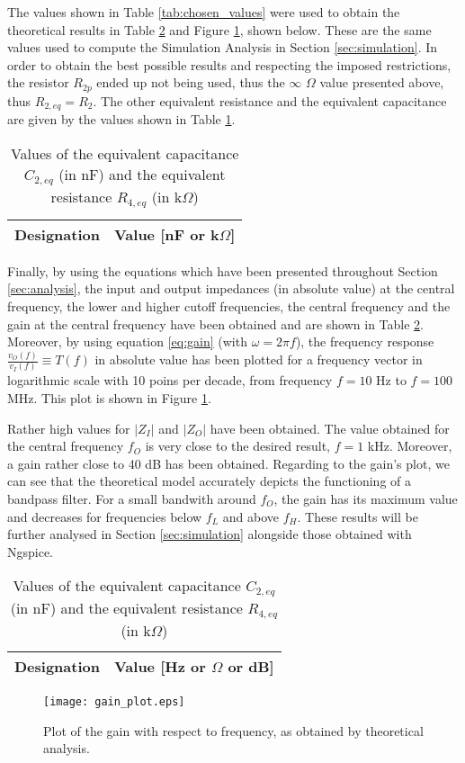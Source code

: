 The values shown in Table \ref{tab:chosen_values} were used to obtain the theoretical results in Table \ref{tab:final_values} and Figure \ref{fig:gain_plot}, shown below. These are the same values used to compute the Simulation Analysis in Section \ref{sec:simulation}. In order to obtain the best possible results and respecting the imposed restrictions, the resistor $R_{2p}$ ended up not being used, thus the $\infty$ $\Omega$ value presented above, thus $R_{2,eq}=R_2$. The other equivalent resistance and the equivalent capacitance are given by the values shown in Table \ref{tab:chosen_equiv_values}.

\begin{table}[H]
  \centering
  \begin{tabular}{|c|c|}
    \hline    
    {\bf Designation} & {\bf Value [nF or k$\Omega$]} \\ \hline
    
  \end{tabular}
  \caption{Values of the equivalent capacitance $C_{2,eq}$ (in nF) and the equivalent resistance $R_{4,eq}$ (in k$\Omega$)}
  \label{tab:chosen_equiv_values}
\end{table}

Finally, by using the equations which have been presented throughout Section \ref{sec:analysis}, the input and output impedances (in absolute value) at the central frequency, the lower and higher cutoff frequencies, the central frequency and the gain at the central frequency have been obtained and are shown in Table \ref{tab:final_values}. Moreover, by using equation \ref{eq:gain} (with $\omega=2\pi f$), the frequency response $\frac{v_O(f)}{v_I(f)}\equiv T(f)$ in absolute value has been plotted for a frequency vector in logarithmic scale with 10 poins per decade, from frequency $f=10$ Hz to $f=100$ MHz. This plot is shown in Figure \ref{fig:gain_plot}.
\par
Rather high values for $|Z_I|$ and $|Z_O|$ have been obtained. The value obtained for the central frequency $f_O$ is very close to the desired result, $f=1$ kHz. Moreover, a gain rather close to 40 dB has been obtained. Regarding to the gain's plot, we can see that the theoretical model accurately depicts the functioning of a bandpass filter. For a small bandwith around $f_O$, the gain has its maximum value and decreases for frequencies below $f_L$ and above $f_H$. These results will be further analysed in Section \ref{sec:simulation} alongside those obtained with Ngspice.

\begin{table}[H]
  \centering
  \begin{tabular}{|c|c|}
    \hline    
    {\bf Designation} & {\bf Value [Hz or $\Omega$ or dB]} \\ \hline
    
  \end{tabular}
  \caption{Values of the equivalent capacitance $C_{2,eq}$ (in nF) and the equivalent resistance $R_{4,eq}$ (in k$\Omega$)}
  \label{tab:final_values}
\end{table}


\begin{figure}[H] \centering
  \texttt{[image: gain\_plot.eps]}
  \caption{Plot of the gain with respect to frequency, as obtained by theoretical analysis.}
  \label{fig:gain_plot}
\end{figure}
